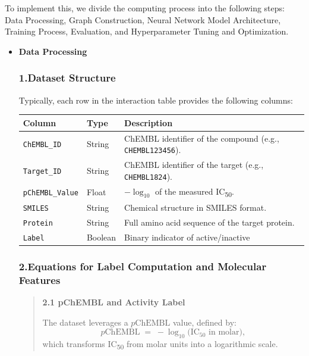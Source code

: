 \documentclass[fontsize=11pt]{article}
\begin{document}
To implement this, we divide the computing process into the following steps: Data Processing, Graph Construction, Neural Network Model Architecture, Training Process, Evaluation, and Hyperparameter Tuning and Optimization.
\begin{itemize}
    \item \textbf{Data Processing} \subsubsection*{1.\quad Dataset Structure}
Typically, each row in the interaction table provides the following columns:

\begin{center}
\begin{tabular}{|l|l|p{9cm}|}
\hline
\textbf{Column}       & \textbf{Type}    & \textbf{Description} \\
\hline
\texttt{ChEMBL\_ID} & String           & ChEMBL identifier of the compound (e.g., \texttt{CHEMBL123456}). \\
\texttt{Target\_ID}   & String           & ChEMBL identifier of the target (e.g., \texttt{CHEMBL1824}). \\
\texttt{pChEMBL\_Value} & Float         & $-\log_{10}$ of the measured IC\textsubscript{50}. \\
\texttt{SMILES}       & String           & Chemical structure in SMILES format. \\
\texttt{Protein}    & String            & Full amino acid sequence of the target protein. \\
\texttt{Label} & Boolean & Binary indicator of active/inactive \\
\hline
\end{tabular}
\end{center}

\subsubsection*{2.\quad Equations for Label Computation and Molecular Features}

\begin{quote}

    \textbf{2.1 pChEMBL and Activity Label}
    
    \quad The dataset leverages a $p\text{ChEMBL}$ value, defined by:
    \[
        p\text{ChEMBL} \;=\; -\log_{10}\bigl(\text{IC}_{50} \text{ in molar}\bigr),
    \]
    which transforms IC\textsubscript{50} from molar units into a logarithmic scale. 
    

\end{quote}
\end{itemize}
\end{document}
